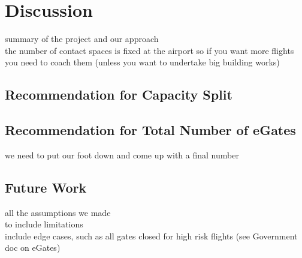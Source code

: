 \documentclass[10pt]{article}
\begin{document}
\section{Discussion}
summary of the project and our approach \\
the number of contact spaces is fixed at the airport so if you want more flights you need to coach them (unless you want to undertake big building works)

\subsection{Recommendation for Capacity Split}

\subsection{Recommendation for Total Number of eGates}
we need to put our foot down and come up with a final number

\subsection{Future Work}
all the assumptions we made \\
to include limitations \\
include edge cases, such as all gates closed for high risk flights (see Government doc on eGates) 


\end{document}
